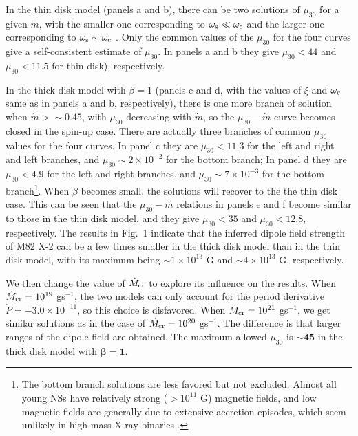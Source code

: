 \documentclass[12pt,preprint]{aastex}
\begin{document}
In the thin disk model (panels a and b),  there can be two solutions of $\mu_{30}$ for a given $\dot{m}$, with the smaller one corresponding to $\omega_{\rm s}\ll \omega_{\rm c}$ and the larger one corresponding to $\omega_{\rm s}\sim \omega_{\rm c}$ \citep[see also][]{dps2015}.
Only the common values of the $\mu_{30}$ for the four curves give a self-consistent estimate of $\mu_{30}$.
In panels a and b they give $\mu_{30}<44$ and $\mu_{30}<11.5$  for thin disk), respectively.

In the thick disk model with $\beta=1$
(panels c and d, with the values of $\xi$ and $\omega_{\rm c}$ same as in panels a and b, respectively),
there is one more branch of solution when $\dot{m}>\sim 0.45$, with $\mu_{30}$ decreasing with $\dot{m}$, so the $\mu_{30}-\dot{m}$ curve becomes closed in the spin-up case. There are actually three branches of common $\mu_{30}$ values for the four curves.
In panel c they are $\mu_{30}<11.3$ for the left and right and left branches, and $\mu_{30}\sim 2\times 10^{-2}$ for the bottom branch;
In panel d they are $\mu_{30}<4.9$ for the left and right branches, and $\mu_{30}\sim 7\times 10^{-3}$ for the bottom branch\footnote{The bottom branch solutions are less favored but not excluded. Almost all young NSs have relatively strong ($>10^{11}$ G) magnetic fields, and low magnetic fields are generally due to extensive accretion episodes, which seem unlikely in high-mass X-ray binaries \citep{bh1991}.}.
When $\beta$ becomes small, the solutions will recover to the the thin disk case. This can be seen that the $\mu_{30}-\dot{m}$ relations in panels e and f become similar to those in the thin disk model, and they give $\mu_{30}<35$ and $\mu_{30}<12.8$, respectively.
The results in Fig.~1 indicate that the inferred dipole field strength of  M82 X-2 can be a few times smaller in the thick disk model than in the thin disk model, with its maximum being $\sim 1\times10^{13}$ G and $\sim 4\times10^{13}$ G, respectively.

We then change the value of $\dot{M}_{\rm cr}$ to explore its influence on the results. When $\dot{M}_{\rm cr}=10^{19}$ gs$^{-1}$, the two models can only account for  the period derivative $\dot{P}=-3.0\times 10^{-11}$, so this choice is disfavored. When $\dot{M}_{\rm cr}=10^{21}$ gs$^{-1}$, we get similar solutions as in the case of $\dot{M}_{\rm cr}=10^{20}$ gs$^{-1}$.
The difference is that larger ranges of the dipole field are obtained. The maximum allowed $\mu_{30}$ is $\bm{\sim 45}$ in the thick disk model with $\bm{\beta=1}$.
\end{document}
